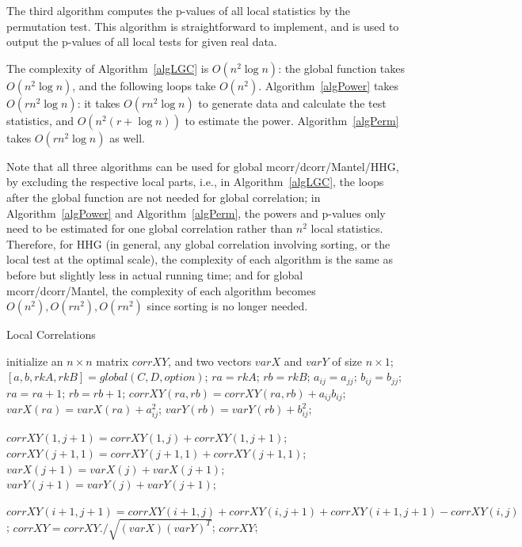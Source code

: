\documentclass[11pt]{article}
\begin{document}
The third algorithm computes the p-values of all local statistics by the permutation test. This algorithm is straightforward to implement, and is used to output the p-values of all local tests for given real data.

The complexity of Algorithm~\ref{algLGC} is $O(n^2 \log n)$: the global function takes $O(n^2 \log n)$, and the following loops take $O(n^2)$. Algorithm~\ref{algPower} takes $O(rn^2 \log n)$: it takes $O(rn^2 \log n)$ to generate data and calculate the test statistics, and $O(n^2 (r+\log n))$ to estimate the power. Algorithm~\ref{algPerm} takes $O(rn^2 \log n)$ as well. 

Note that all three algorithms can be used for global mcorr/dcorr/Mantel/HHG, by excluding the respective local parts, i.e., in Algorithm~\ref{algLGC}, the loops after the global function are not needed for global correlation; in Algorithm~\ref{algPower} and Algorithm~\ref{algPerm}, the powers and p-values only need to be estimated for one global correlation rather than $n^2$ local statistics. Therefore, for HHG (in general, any global correlation involving sorting, or the local test at the optimal scale), the complexity of each algorithm is the same as before but slightly less in actual running time; and for global mcorr/dcorr/Mantel, the complexity of each algorithm becomes $O(n^2), O(rn^2), O(rn^2)$ since sorting is no longer needed.

\begin{algorithm}
\caption{Local Correlations}
\label{algLGC}
\begin{algorithmic}
  
\State initialize an $n \times n$ matrix $corrXY$, and two vectors $varX$ and $varY$ of size $n \times 1$;
\State $[a,b,rkA,rkB]=global(C,D,option)$; 
\State $ra=rkA$; $rb=rkB$;
\State $a_{ij}=a_{jj}$; 
\EndIf
{}
\State $b_{ij}=b_{jj}$;
\EndIf
\State $ra=ra+1$; $rb=rb+1$;
\State $corrXY(ra, rb)=corrXY(ra, rb)+a_{ij}b_{ij}$;
\State $varX(ra)=varX(ra)+a_{ij}^2$;
\State $varY(rb)=varY(rb)+b_{ij}^2$;
\EndFor
\EndFor

\State $corrXY(1, j+1)=corrXY(1, j)+corrXY(1, j+1)$;
\State $corrXY(j+1,1)=corrXY(j+1,1)+corrXY(j+1,1)$;
\State $varX(j+1)=varX(j)+varX(j+1)$;
\State $varY(j+1)=varY(j)+varY(j+1)$;
\EndFor

\State $corrXY(i+1,j+1)=corrXY(i+1,j)+corrXY(i,j+1)+corrXY(i+1,j+1)-corrXY(i,j)$;
\EndFor
\EndFor
\State $corrXY=corrXY./\sqrt{(varX) (varY)^{T}}$; 
\State \Return $corrXY$;
\EndFunction
\end{algorithmic}
\end{algorithm}
\end{document}
